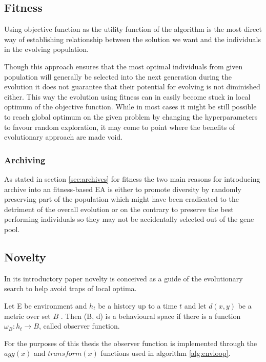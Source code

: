 \subsection{Fitness}
\label{sec:fitness}

Using objective function as the utility function of the algorithm is the most direct way of establishing relationship between the solution we want and the individuals in the evolving population.


Though this approach ensures that the most optimal individuals from given population  will generally be selected into the next generation during the evolution it does not guarantee that their potential for evolving is not diminished either. This way the evolution using fitness can in easily become stuck in local optimum of the objective function. While in most cases it might be still possible to reach global optimum on the given problem by changing the hyperparameters to favour random exploration, it may come to point where the benefits of evolutionary approach are made void.

\subsubsection{Archiving}
As stated in section \ref{sec:archives} for fitness the two main reasons for introducing archive into an fitness-based EA is either to promote diversity by randomly preserving part of the population which might have been eradicated to the detriment of the overall evolution or on the contrary to preserve the best performing individuals so they may not be accidentally selected out of the gene pool. 

\subsection{Novelty}
\label{sec:novelty}
In its introductory paper novelty \cite{noveltyarticle} is conceived as a guide of the evolutionary search to help avoid traps of local optima. 
\begin{defn}
\label{def:observer}
Let E be environment and $ h_t $ be a history up to a time $ t $ and let $ d(x,y) $ be a metric over set $ B $ . Then (B, d) is a behavioural space if there is  a function $ \omega_B: h_t\rightarrow B $, called observer function. 
\end{defn}

For the purposes of this thesis the observer function is implemented through the $ agg(x) $ and $ transform(x) $ functions used in algorithm \ref{alg:envloop}. 

